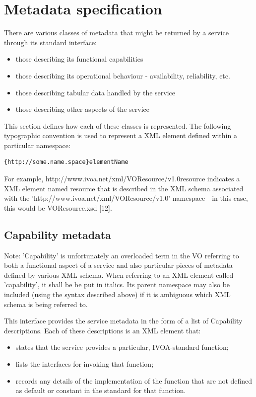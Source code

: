 \documentclass[11pt,letter]{ivoa}
\begin{document}
\section{Metadata specification}

 There are various classes of metadata that might be returned by a service through its standard interface:

\begin{itemize}
\item those describing its functional capabilities
\item those describing its operational behaviour - availability, reliability, etc.
\item those describing tabular data handled by the service
\item those describing other aspects of the service 
\end{itemize}

This section defines how each of these classes is represented. The following typographic convention is used to represent a XML element defined within a particular namespace:

\begin{verbatim}
{http://some.name.space}elementName
\end{verbatim}

For example, {http://www.ivoa.net/xml/VOResource/v1.0}resource indicates a XML element named resource that is described in the XML schema associated with the 'http://www.ivoa.net/xml/VOResource/v1.0' namespace - in this case, this would be VOResource.xsd [12]. 

\subsection{Capability metadata}


Note:
    'Capability' is unfortunately an overloaded term in the VO referring to both a functional aspect of a service and also particular pieces of metadata defined by various XML schema. When referring to an XML element called 'capability', it shall be be put in italics. Its parent namespace may also be included (using the syntax described above) if it is ambiguous which XML schema is being referred to. 
    
This interface provides the service metadata in the form of a list of Capability descriptions. Each of these descriptions is an XML element that:

\begin{itemize}
\item states that the service provides a particular, IVOA-standard function;
\item lists the interfaces for invoking that function;
\item records any details of the implementation of the function that are not defined as default or constant in the standard for that function. 
\end{itemize}
\end{document}
